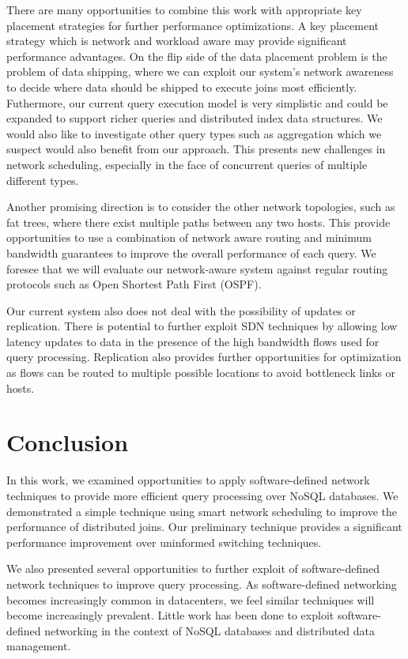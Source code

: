 \documentclass{acm_proc_article-sp}
\begin{document}
There are many opportunities to combine this work with appropriate key placement strategies for further performance optimizations.
A key placement strategy which is network and workload aware may provide significant performance advantages.
On the flip side of the data placement problem is the problem of data shipping, where we can exploit our system's network awareness to decide where data should be shipped to execute joins most efficiently.
Futhermore, our current query execution model is very simplistic and could be expanded to support richer queries and distributed index data structures.
We would also like to investigate other query types such as aggregation which we suspect would also benefit from our approach.
This presents new challenges in network scheduling, especially in the face of concurrent queries of multiple different types.

Another promising direction is to consider the other network topologies, such as fat trees, where there exist multiple paths between any two hosts.
This provide opportunities to use a combination of network aware routing and minimum bandwidth guarantees to improve the overall performance of each query.
We foresee that we will evaluate our network-aware system against regular routing protocols such as Open Shortest Path First (OSPF).

Our current system also does not deal with the possibility of updates or replication.
There is potential to further exploit SDN techniques by allowing low latency updates to data in the presence of the high bandwidth flows used
for query processing.
Replication also provides further opportunities for optimization as flows can be routed to multiple possible locations to avoid bottleneck links or hosts.

\section{Conclusion}

In this work, we examined opportunities to apply software-defined network techniques to provide more efficient query processing over NoSQL databases.
We demonstrated a simple technique using smart network scheduling to improve the performance of distributed joins.
Our preliminary technique provides a significant performance improvement over uninformed switching techniques.

We also presented several opportunities to further exploit of software-defined network techniques to improve query processing.
As software-defined networking becomes increasingly common in datacenters, we feel similar techniques will become increasingly prevalent.  Little work has been done to exploit software-defined networking in the context of NoSQL databases and distributed data management.



\end{document}
